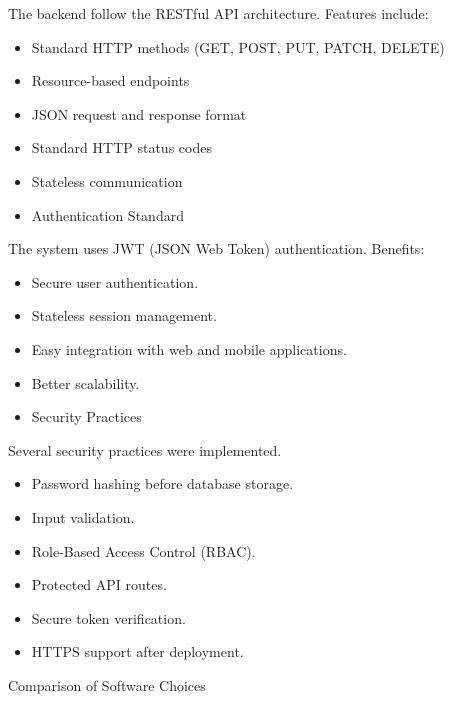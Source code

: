 The backend follow the RESTful API architecture.
Features include:
\begin{itemize}
\item Standard HTTP methods (GET, POST, PUT, PATCH, DELETE)
\item Resource-based endpoints
\item JSON request and response format
\item Standard HTTP status codes
\item Stateless communication
\item Authentication Standard
\end{itemize}

The system uses JWT (JSON Web Token) authentication.
Benefits:
\begin{itemize}
\item Secure user authentication.
\item Stateless session management.
\item Easy integration with web and mobile applications.
\item Better scalability.
\item Security Practices
\end{itemize}

Several security practices were implemented.
\begin{itemize}
\item Password hashing before database storage.
\item Input validation.
\item Role-Based Access Control (RBAC).
\item Protected API routes.
\item Secure token verification.
\item HTTPS support after deployment.
\end{itemize}

Comparison of Software Choices
\small

